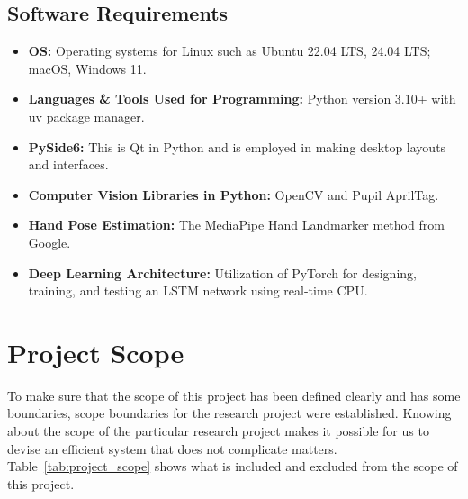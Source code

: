 \subsection{Software Requirements}
\label{subsec:software_req}
\begin{itemize}
    \item \textbf{OS:} Operating systems for Linux such as Ubuntu 22.04 LTS, 24.04 LTS; macOS, Windows 11.
    \item \textbf{Languages \& Tools Used for Programming:} Python version 3.10+ with uv package manager.
    \item \textbf{PySide6:} This is Qt in Python and is employed in making desktop layouts and interfaces.
    \item \textbf{Computer Vision Libraries in Python:} OpenCV and Pupil AprilTag.
    \item \textbf{Hand Pose Estimation:} The MediaPipe Hand Landmarker method from Google.
    \item \textbf{Deep Learning Architecture:} Utilization of PyTorch for designing, training, and testing an LSTM network using real-time CPU.
\end{itemize}

\section{Project Scope}
\label{sec:project_scope}
To make sure that the scope of this project has been defined clearly and has some boundaries, scope boundaries for the research project were established. Knowing about the scope of the particular research project makes it possible for us to devise an efficient system that does not complicate matters. Table~\ref{tab:project_scope} shows what is included and excluded from the scope of this project.

